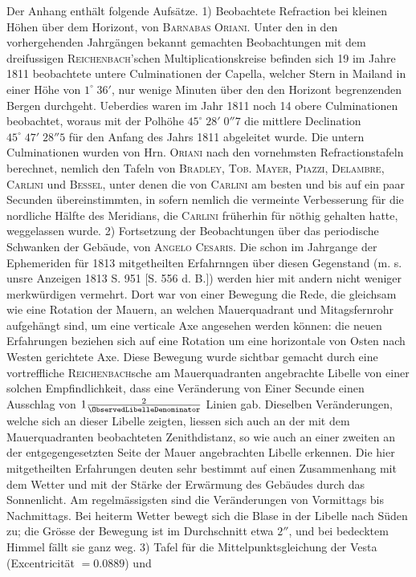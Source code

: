 Der Anhang enthält folgende Aufsätze. 1) Beobachtete Refraction bei kleinen Höhen über dem Horizont, von \textsc{Barnabas Oriani}. Unter den in den vorhergehenden Jahrgängen bekannt gemachten Beobachtungen mit dem dreifussigen \textsc{Reichenbach}'schen Multiplicationskreise befinden sich 19 im Jahre 1811 beobachtete untere Culminationen der Capella, welcher Stern in Mailand in einer Höhe von $1^\circ\;36'$, nur wenige Minuten über den den Horizont begrenzenden Bergen durchgeht. Ueberdies waren im Jahr 1811 noch 14 obere Culminationen beobachtet, woraus mit der Polhöhe $45^\circ\;28'\;0''7$ die mittlere Declination $45^\circ\;47'\;28''5$ für den Anfang des Jahrs 1811 abgeleitet wurde. Die untern Culminationen wurden von Hrn. \textsc{Oriani} nach den vornehmsten Refractionstafeln berechnet, nemlich den Tafeln von \textsc{Bradley}, \textsc{Tob. Mayer}, \textsc{Piazzi}, \textsc{Delambre}, \textsc{Carlini} und \textsc{Bessel}, unter denen die von \textsc{Carlini} am besten und bis auf ein paar Secunden übereinstimmten, in sofern nemlich die vermeinte Verbesserung für die nordliche Hälfte des Meridians, die \textsc{Carlini} früherhin für nöthig gehalten hatte, weggelassen wurde. 2) Fortsetzung der Beobachtungen über das periodische Schwanken der Gebäude, von \textsc{Angelo Cesaris}. Die schon im Jahrgange der Ephemeriden für 1813 mitgetheilten Erfahrnngen über diesen Gegenstand (m. s. unsre Anzeigen 1813 S. 951 [S. 556 d. B.]) werden hier mit andern nicht weniger merkwürdigen vermehrt. Dort war von einer Bewegung die Rede, die gleichsam wie eine Rotation der Mauern, an welchen Mauerquadrant und Mitagsfernrohr aufgehängt sind, um eine verticale Axe angesehen werden können: die neuen Erfahrungen beziehen sich auf eine Rotation um eine horizontale von Osten nach Westen gerichtete Axe. Diese Bewegung wurde sichtbar gemacht durch eine vortreffliche \textsc{Reichenbach}sche am Mauerquadranten angebrachte Libelle von einer solchen Empfindlichkeit, dass eine Veränderung von Einer Secunde einen Ausschlag von $1\frac{2}{\ObservedLibelleDenominator}$ Linien gab. Dieselben Veränderungen, welche sich an dieser Libelle zeigten, liessen sich auch an der mit dem Mauerquadranten beobachteten Zenithdistanz, so wie auch an einer zweiten an der entgegengesetzten Seite der Mauer angebrachten Libelle erkennen. Die hier mitgetheilten Erfahrungen deuten sehr bestimmt auf einen Zusammenhang mit dem Wetter und mit der Stärke der Erwärmung des Gebäudes durch das Sonnenlicht. Am regelmässigsten sind die Veränderungen von Vormittags bis Nachmittags. Bei heiterm Wetter bewegt sich die Blase in der Libelle nach Süden zu; die Grösse der Bewegung ist im Durchschnitt etwa $2''$, und bei bedecktem Himmel fällt sie ganz weg. 3) Tafel für die Mittelpunktsgleichung der Vesta (Excentricität $=0.0889$) und\par
